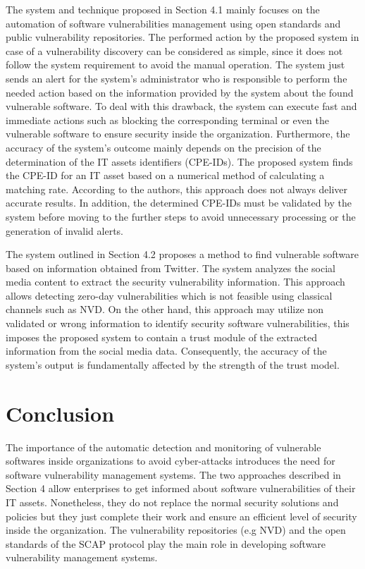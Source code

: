 \documentclass{llncs}
\begin{document}
\par The system and technique proposed in Section 4.1 mainly focuses on the automation of software vulnerabilities management using open standards and public vulnerability repositories. The performed action by the proposed system in case of a vulnerability discovery can be considered as simple, since it does not follow the system requirement to avoid the manual operation. The system just sends an alert for the system's administrator who is responsible to perform the needed action based on the information provided by the system about the found vulnerable software. To deal with this drawback, the system can execute fast and immediate actions such as  blocking the corresponding terminal or even the vulnerable software  to ensure security inside the organization. Furthermore, the accuracy of the system's outcome mainly depends on the precision of the determination of the IT assets identifiers (CPE-IDs). The proposed system finds the CPE-ID for an IT asset based on a numerical method of calculating a matching rate. According to the authors, this approach does not always deliver accurate results. In addition, the determined CPE-IDs must be validated by the system before moving to the further steps to avoid unnecessary processing or the generation of invalid alerts.


\par The system outlined in Section 4.2 proposes a method to find vulnerable software based on information obtained from Twitter. The system analyzes the social media content to extract the security vulnerability information. This approach allows detecting zero-day vulnerabilities which is not feasible using classical channels such as NVD. On the other hand, this approach may utilize non validated or wrong information to  identify security software vulnerabilities, this imposes the proposed system to contain a trust module of the extracted information from the social media data. Consequently, the accuracy of the system's output is  fundamentally affected by the strength of the trust model.
 
 \newpage  
\section{Conclusion}

\par The importance of the automatic detection and monitoring of vulnerable softwares inside organizations to avoid cyber-attacks introduces the need for software vulnerability management systems. The two approaches described in Section 4 allow enterprises to get informed about software vulnerabilities of their IT assets. Nonetheless, they do not replace the normal security solutions and policies but they just complete their work and ensure an efficient level of security inside the organization. The vulnerability repositories (e.g NVD) and the open standards of the SCAP protocol play the main role in developing software vulnerability management systems.   
\end{document}
